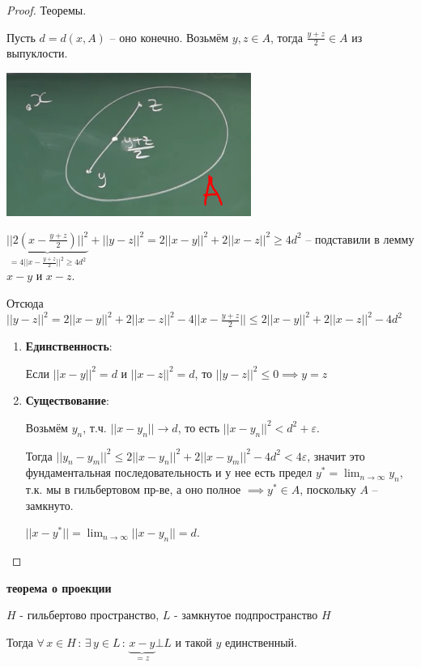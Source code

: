 \begin{proof}
    Теоремы.

    Пусть $d = d(x, A)$ -- оно конечно. Возьмём $y, z \in A$, тогда $\frac{y + z}{2} \in A$ из выпуклости.

    \begin{center}
        \includegraphics[width=8cm]{assets/05-fourierreihe/existance-of-the-best-approximation.png}
    \end{center}

    $\underbrace{|| 2 \left(x - \frac{y + z}{2}\right) ||^2}_{= 4 || x - \frac{y + z}{2} ||^2 \geqslant 4d^2} + ||y - z||^2 = 2 ||x - y||^2 + 2||x - z||^2 \geqslant 4d^2$ -- подставили в лемму $x - y$ и $x - z$.

    Отсюда $||y-z||^2 = 2 ||x - y||^2 + 2 ||x - z||^2 - 4 || x - \frac{y + z}{2}|| \leqslant 2 ||x - y||^2 + 2||x - z||^2 - 4d^2$

    \begin{enumerate}
        \item {
            \textbf{Единственность}:

            Если $||x - y||^2 = d$ и $||x - z||^2 = d$, то $||y - z||^2 \leqslant 0 \implies y = z$
        }
        \item {
            \textbf{Существование}:

            Возьмём $y_n$, т.ч. $||x - y_n|| \rightarrow d$, то есть $|| x - y_n ||^2 < d^2 + \varepsilon$.

            Тогда $||y_n - y_m||^2 \leqslant 2 ||x - y_n||^2 + 2||x - y_m||^2 - 4d^2 < 4\varepsilon$, значит это фундаментальная последовательность и у нее есть предел $y^* = \lim_{n \to \infty} y_n$, т.к. мы в гильбертовом пр-ве, а оно полное $\implies y^* \in A$, поскольку $A$ -- замкнуто.

            $||x - y^*|| = \lim_{n \to \infty} ||x - y_n|| = d$.
        }
    \end{enumerate}
\end{proof}

\begin{theorem}
    \textbf{теорема о проекции}

    $H$ - гильбертово пространство, $L$ - замкнутое подпространство $H$

    Тогда $\forall \, x \in H \, : \, \exists \, y \in L \, : \, \underbrace{x - y}_{=z} \bot L$ и
    такой $y$ единственный.
\end{theorem}

